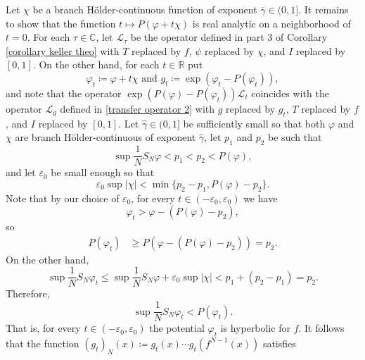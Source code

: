\documentclass[10pt,a4paper]{amsart}
\numberwithin{equation}{section} %
\numberwithin{figure}{section} %
\newcommand{\C}{\mathbb{C}}
\newcommand{\R}{\mathbb{R}}
\renewcommand{\=}{\coloneqq}
\begin{document}
Let $\chi$ be a branch Hölder-continuous function of exponent $\overline{\gamma}\in (0,1]$. It remains to show that the function $t\mapsto P(\varphi + t\chi)$ is real analytic on a neighborhood of $t=0$. For each $\tau\in\C$, let $\mathscr{L}_{\tau}$ be the operator defined in part 3 of Corollary \ref{corollary keller theo} with $T$ replaced by $f$, $\psi$ replaced by $\chi$, and $I$ replaced by $[0,1]$. On the other hand, for each $t\in \R$ put
\begin{equation*}
    \varphi_t \= \varphi + t\chi\text{ and } g_t\= \exp(\varphi_t - P(\varphi_t)),
\end{equation*}
and note that the operator $\exp(P(\varphi)-P(\varphi_t))\mathscr{L}_{t}$ coincides with the operator $\mathscr{L}_{g}$ defined in \eqref{transfer operator 2} with $g$ replaced by $g_t$, $T$ replaced by $f$, and $I$ replaced by $[0,1]$. Let $\widehat{\gamma}\in(0,1]$ be sufficiently small so that both $\varphi$ and $\chi$ are branch Hölder-continuous of exponent $\widehat{\gamma}$, let $p_1$ and $p_2$ be such that
\begin{equation*}
    \sup\frac{1}{N}S_N\varphi < p_1 < p_2 < P(\varphi),
\end{equation*}
and let $\varepsilon_0$ be small enough so that
\begin{equation*}
    \varepsilon_0 \sup|\chi| < \min\{p_2-p_1, P(\varphi)-p_2\}.
\end{equation*}
Note that by our choice of $\varepsilon_0$, for every $t\in (-\varepsilon_0,\varepsilon_0)$ we have
\begin{equation*}
    \varphi_t > \varphi - (P(\varphi)-p_2),
\end{equation*}
so
\begin{equation*}
    \begin{split}
        P(\varphi_t)&\geq
         P(\varphi-(P(\varphi)-p_2))=p_2.
    \end{split}
\end{equation*}
On the other hand,
\begin{equation*}
    \sup \frac{1}{N}S_N \varphi_t \leq \sup \frac{1}{N}S_N \varphi + \varepsilon_0\sup |\chi| < p_1 + (p_2-p_1) = p_2. 
\end{equation*}
Therefore,
\begin{equation*}
    \sup\frac{1}{N}S_N\varphi_t < P(\varphi_t).
\end{equation*}
That is, for every $t\in (-\varepsilon_0,\varepsilon_0)$ the potential $\varphi_t$ is hyperbolic for $f$. It follows that the function $(g_t)_N(x) \= g_t(x)\cdots g_t(f^{N-1}(x))$ satisfies 
\end{document}
